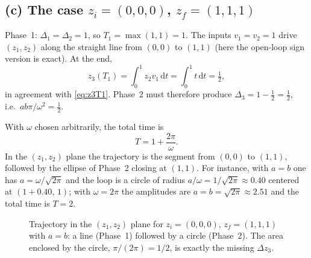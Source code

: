 \documentclass[11pt,a4paper]{article}
\def\boldsymbol#1{#1}%
\newcommand{\z}{\boldsymbol{z}}
\theoremstyle{definition}
\theoremstyle{plain}
\theoremstyle{remark}
\begin{document}
\subsection{(c) The case $\z_i=(0,0,0)$, $\z_f=(1,1,1)$}

Phase~1: $\Delta_1=\Delta_2=1$, so $T_1=\max(1,1)=1$. The inputs $v_1=v_2=1$ drive $(z_1,z_2)$ along the straight line from $(0,0)$ to $(1,1)$ (here the open-loop sign version is exact). At the end,
\[
  z_3(T_1)=\int_0^1 z_2v_1\,\mathrm dt=\int_0^1 t\,\mathrm dt=\tfrac12 ,
\]
in agreement with \eqref{eq:z3T1}. Phase~2 must therefore produce $\Delta_3=1-\tfrac12=\tfrac12$, i.e.\ $ab\pi/\omega^2=\tfrac12$.

With $\omega$ chosen arbitrarily, the total time is
\[
  T=1+\frac{2\pi}{\omega}.
\]
In the $(z_1,z_2)$ plane the trajectory is the segment from $(0,0)$ to $(1,1)$, followed by the ellipse of Phase~2 closing at $(1,1)$. For instance, with $a=b$ one has $a=\omega/\sqrt{2\pi}$ and the loop is a circle of radius $a/\omega=1/\sqrt{2\pi}\approx0.40$ centered at $(1+0.40,\,1)$; with $\omega=2\pi$ the amplitudes are $a=b=\sqrt{2\pi}\approx2.51$ and the total time is $T=2$.

\begin{figure}[H]
\centering
{}
\caption{Trajectory in the $(z_1,z_2)$ plane for $\z_i=(0,0,0)$, $\z_f=(1,1,1)$ with $a=b$: a line (Phase~1) followed by a circle (Phase~2). The area enclosed by the circle, $\pi/(2\pi)=1/2$, is exactly the missing $\Delta z_3$.}
\end{figure}
\end{document}
